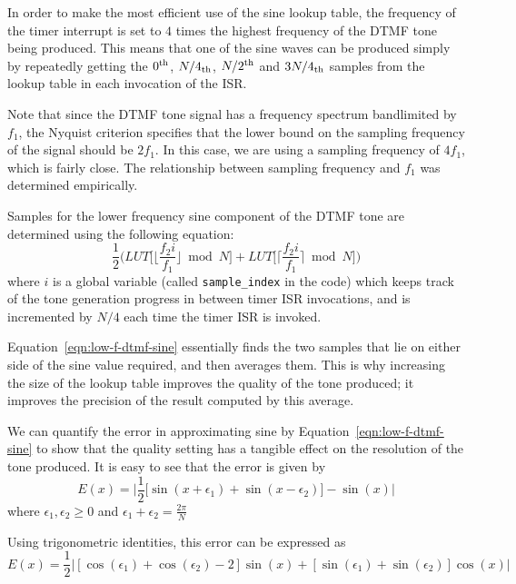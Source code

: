 \documentclass[11pt,a4paper,twocolumn]{scrartcl}
\begin{document}
In order to make the most efficient use of the sine lookup table, the frequency of the timer interrupt is set to $4$ times the highest frequency of the DTMF tone being produced. This means that one of the sine waves can be produced simply by repeatedly getting the $0\textsuperscript{th}$, $N/4\textsubscript{th}$, $N/2\textsuperscript{th}$ and $3N/4\textsubscript{th}$ samples from the lookup table in each invocation of the ISR. 

Note that since the DTMF tone signal has a frequency spectrum bandlimited by $f_1$, the Nyquist criterion specifies that the lower bound on the sampling frequency of the signal should be $2f_1$. In this case, we are using a sampling frequency of $4f_1$, which is fairly close. The relationship between sampling frequency and $f_1$ was determined empirically.

Samples for the lower frequency sine component of the DTMF tone are determined using the following equation:
\begin{equation}
   \label{eqn:low-f-dtmf-sine}
   \frac{1}{2}\Bigg(LUT\bigg[\bigg\lfloor\frac{f_2i}{f_1}\bigg\rfloor \bmod N\bigg] + LUT\bigg[\bigg\lceil\frac{f_2i}{f_1}\bigg\rceil \bmod N\bigg]\Bigg)
\end{equation}
where $i$ is a global variable (called \verb!sample_index! in the code) which keeps track of the tone generation progress in between timer ISR invocations, and is incremented by $N/4$ each time the timer ISR is invoked.

Equation~\ref{eqn:low-f-dtmf-sine} essentially finds the two samples that lie on either side of the sine value required, and then averages them. This is why increasing the size of the lookup table improves the quality of the tone produced; it improves the precision of the result computed by this average.

We can quantify the error in approximating sine by Equation~\ref{eqn:low-f-dtmf-sine} to show that the quality setting has a tangible effect on the resolution of the tone produced. It is easy to see that the error is given by
$$ E(x) = \bigg|\frac{1}{2}\bigg[\sin(x + \epsilon_1) + \sin(x - \epsilon_2)\bigg] - \sin(x)\bigg| $$
where $\epsilon_1, \epsilon_2 \ge 0$ and $\epsilon_1 + \epsilon_2 = \frac{2\pi}{N}$

Using trigonometric identities, this error can be expressed as
\begin{equation*}
E(x) = \frac{1}{2}\bigg|[\cos(\epsilon_1) + \cos(\epsilon_2) - 2]\sin(x) + [\sin(\epsilon_1) + \sin(\epsilon_2)]\cos(x)\bigg|
\end{equation*}
\end{document}
